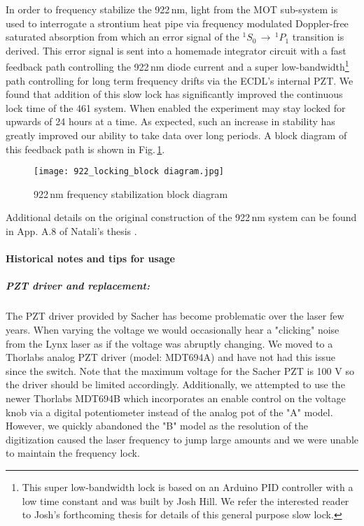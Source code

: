 In order to frequency stabilize the 922\,nm, light from the MOT sub-system is used to interrogate a strontium heat pipe via frequency modulated Doppler-free saturated absorption from which an error signal of the $^1S_0\,\rightarrow\,^1P_1$ transition is derived.
This error signal is sent into a homemade integrator circuit with a fast feedback path controlling the 922\,nm diode current and a super low-bandwidth\footnote{This super low-bandwidth lock is based on an Arduino PID controller with a low time constant and was built by Josh Hill.
We refer the interested reader to Josh's forthcoming thesis for details of this general purpose slow lock.} 
path controlling for long term frequency drifts via the ECDL's internal PZT.
We found that addition of this slow lock has significantly improved the continuous lock time of the 461 system. 
When enabled the experiment may stay locked for upwards of 24 hours at a time. 
As expected, such an increase in stability has greatly improved our ability to take data over long periods.
A block diagram of this feedback path is shown in Fig.\,\ref{fig:922freqLock}.
	\begin{figure}
		\centerline{
		\texttt{[image: 922\_locking\_block diagram.jpg]}}
		\caption{922\,nm frequency stabilization block diagram}{}
		\label{fig:922freqLock}
	\end{figure} 

Additional details on the original construction of the 922\,nm system can be found in App. A.8 of Natali's thesis \cite{MartinezdeEscolar2010}.

\paragraph{Historical notes and tips for usage}
\subparagraph{PZT driver and replacement:}
The PZT driver provided by Sacher has become problematic over the laser few years.
When varying the voltage we would occasionally hear a "clicking" noise from the Lynx laser as if the voltage was abruptly changing.
We moved to a Thorlabs analog PZT driver (model: MDT694A) and have not had this issue since the switch.
Note that the maximum voltage for the Sacher PZT is 100 V so the driver should be limited accordingly.
Additionally, we attempted to use the newer Thorlabs MDT694B which incorporates an enable control on the voltage knob via a digital potentiometer instead of the analog pot of the "A" model.
However, we quickly abandoned the "B" model as the resolution of the digitization caused the laser frequency to jump large amounts and we were unable to maintain the frequency lock.

